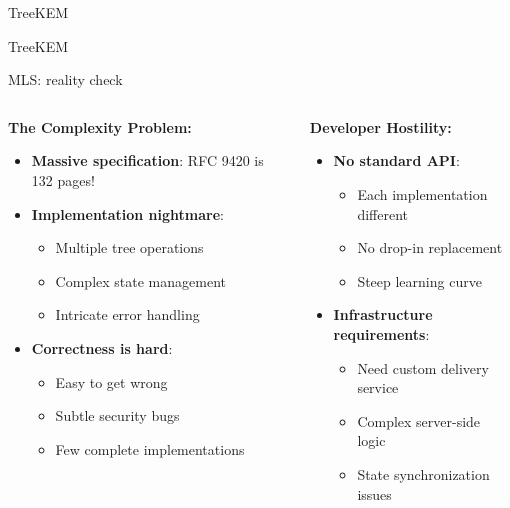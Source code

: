 \documentclass[aspectratio=169, lualatex, handout]{beamer}
\begin{document}
\begin{frame}{TreeKEM}
\end{frame}

\begin{frame}{TreeKEM}
\end{frame}

\begin{frame}{MLS: reality check}
	\begin{columns}[c]
		\begin{column}{0.5\textwidth}
			\textbf{The Complexity Problem:}
			\begin{itemize}
				\item \textbf{Massive specification}: RFC 9420 is 132 pages!
				\item \textbf{Implementation nightmare}:
				      \begin{itemize}
					      \item Multiple tree operations
					      \item Complex state management
					      \item Intricate error handling
				      \end{itemize}
				\item \textbf{Correctness is hard}:
				      \begin{itemize}
					      \item Easy to get wrong
					      \item Subtle security bugs
					      \item Few complete implementations
				      \end{itemize}
			\end{itemize}
		\end{column}
		\begin{column}{0.5\textwidth}
			\textbf{Developer Hostility:}
			\begin{itemize}
				\item \textbf{No standard API}:
				      \begin{itemize}
					      \item Each implementation different
					      \item No drop-in replacement
					      \item Steep learning curve
				      \end{itemize}
				\item \textbf{Infrastructure requirements}:
				      \begin{itemize}
					      \item Need custom delivery service
					      \item Complex server-side logic
					      \item State synchronization issues
				      \end{itemize}
			\end{itemize}
		\end{column}
	\end{columns}
\end{frame}

\begin{frame}[plain]
	\titlepage
\end{frame}
\end{document}
